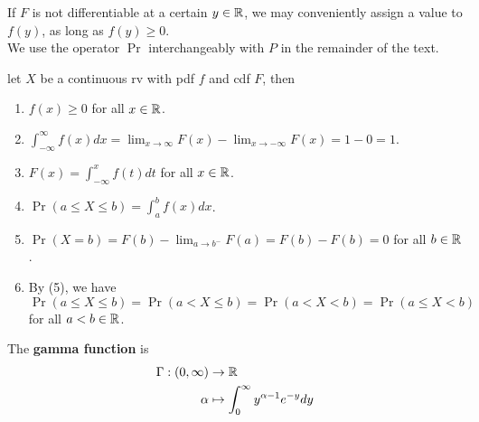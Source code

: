 \documentclass[11pt,fleqn]{book} %
\begin{document}
\begin{remark} 
If \(F\) is not differentiable at a certain \(y \in \mathbb{R}\), we may conveniently assign a value to \(f(y)\), as long as \(f(y) \geq 0\).\\
\indent We use the operator \(\Pr\) interchangeably with \(P\) in the remainder of the text.
\end{remark}

\begin{remark} let \(X\) be a continuous rv with pdf \(f\) and cdf \(F\), then
\begin{enumerate}
\item \(f(x) \geq 0\) for all \(x \in \mathbb{R}\).
\item \(\int_{-\infty}^\infty f(x) dx = \lim_{x\rightarrow\infty}F(x) - \lim_{x\rightarrow-\infty}F(x) = 1 - 0 = 1\).
\item \(F(x) = \int_{-\infty}^x f(t) dt\) for all \(x \in \mathbb{R}\).
\item \(\Pr(a \leq X \leq b) = \int_a^b f(x) dx\).
\item \(\Pr(X = b) = F(b) - \lim_{a\rightarrow b^-} F(a) = F(b) - F(b) = 0\) for all \(b \in \mathbb{R}\).
\item By (5), we have \(\Pr(a \leq X \leq b) = \Pr(a < X \leq b) = \Pr(a < X < b) = \Pr(a \leq X < b)\) for all \(a < b \in \mathbb{R}\).
\end{enumerate}
\end{remark}

\begin{definition} 
The \textbf{gamma function} is
\[
\begin{aligned}
\Gamma: (0, \infty) &\rightarrow \mathbb{R} \\
\alpha &\mapsto \int_0^\infty y^{\alpha-1} e^{-y} dy
\end{aligned}
\]
\end{definition}
\end{document}
